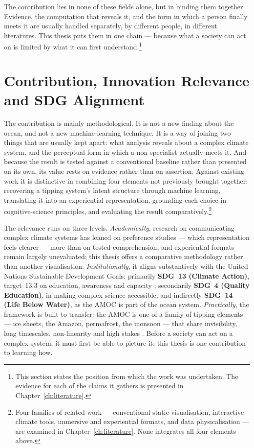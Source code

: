 The contribution lies in none of these fields alone, but in binding them together. Evidence, the computation that reveals it, and the form in which a person finally meets it are usually handled separately, by different people, in different literatures. This thesis puts them in one chain --- because what a society can act on is limited by what it can first understand.\footnote{This section states the position from which the work was undertaken. The evidence for each of the claims it gathers is presented in Chapter~\ref{ch:literature}.}

\section{Contribution, Innovation Relevance and SDG Alignment}
\label{sec:contribution}

The contribution is mainly methodological. It is not a new finding about the ocean, and not a new machine-learning technique. It is a way of joining two things that are usually kept apart: what analysis reveals about a complex climate system, and the perceptual form in which a non-specialist actually meets it. And because the result is tested against a conventional baseline rather than presented on its own, its value rests on evidence rather than on assertion. Against existing work it is distinctive in combining four elements not previously brought together: recovering a tipping system's latent structure through machine learning, translating it into an experiential representation, grounding each choice in cognitive-science principles, and evaluating the result comparatively.\footnote{Four families of related work --- conventional static visualisation, interactive climate tools, immersive and experiential formats, and data physicalisation --- are examined in Chapter~\ref{ch:literature}. None integrates all four elements above.}
 
The relevance runs on three levels. \emph{Academically}, research on communicating complex climate systems has leaned on preference studies --- which representation feels clearer --- more than on tested comprehension, and experiential formats remain largely unevaluated; this thesis offers a comparative methodology rather than another visualisation. \emph{Institutionally}, it aligns substantively with the United Nations Sustainable Development Goals: primarily \textbf{SDG~13 (Climate Action)}, target~13.3 on education, awareness and capacity \citep{un2015}; secondarily \textbf{SDG~4 (Quality Education)}, in making complex science accessible; and indirectly \textbf{SDG~14 (Life Below Water)}, as the AMOC is part of the ocean system. \emph{Practically}, the framework is built to transfer: the AMOC is one of a family of tipping elements --- ice sheets, the Amazon, permafrost, the monsoon --- that share invisibility, long timescales, non-linearity and high stakes \citep{armstrongmckay2022, lenton2008}. Before a society can act on a complex system, it must first be able to picture it; this thesis is one contribution to learning how.

